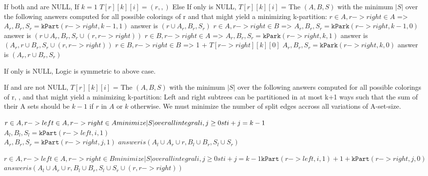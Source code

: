 \documentclass[11pt]{article}
\begin{document}
    If both \rleft and \rright are NULL,
        If $k=1$
            $T[r][k][i] = ({r}, {}, {})$
        Else
    If only \rleft is NULL,
        $T[r][k][i]$ = The $(A,B,S)$ with the minimum $|S|$ over the following answers computed for all possible colorings of r and \rright that might yield a minimizing k-partition:
          $r \in A, r->right \in A$ =>
            $A_r, B_r, S_r = \mathtt{kPart}(r->right,k-1,1)$
            answer is $({r} \cup A_r, B_r, S_r)$
          $r \in A, r->right \in B$ =>
            $A_r, B_r, S_r = \mathtt{kPark}(r->right,k-1,0)$
            answer is $({r} \cup A_r, B_r, S_r \cup {(r, r->right)})$
          $r \in B, r->right \in A$ =>
            $A_r, B_r, S_r = \mathtt{kPark}(r->right,k,1)$
            answer is $(A_r,{r} \cup B_r, S_r \cup {(r, r->right)})$
          $r \in B, r->right \in B$ => 1 + $T[r->right][k][0]$
            $A_r, B_r, S_r = \mathtt{kPark}(r->right,k,0)$
            answer is $(A_r,{r} \cup B_r, S_r)$

    If only \rright is NULL,
        Logic is symmetric to above case.

    If \rleft and \rright are not NULL,
        $T[r][k][i]$ = The $(A,B,S)$ with the minimum $|S|$ over the following answers computed for all possible colorings of r, \rright, and \rleft that might yield a minimizing k-partition:
                Left and right subtrees can be partitioned in at most k+1 ways such that the sum of their A sets should be $k-1$ if $r$ in $A$ or $k$ otherwise.
                We must minimize the number of split edges accross all variations of A-set-size.

          $r \in A, r->left \in A, r->right \in A\\
              minimize |S| over all integral i,j \geq 0 st i+j = k-1$\\
                $A_l, B_l, S_l = \mathtt{kPart}(r->left,i,1)$\\
                $A_r, B_r, S_r = \mathtt{kPart}(r->right,j,1)$
                $answer is (A_l \cup A_r \cup {r},B_l \cup B_r,S_l \cup S_r)$

          $r \in A, r->left \in A, r->right \in B
              minimize |S| over all integral i,j \geq 0 st i+j = k-1
                    \mathtt{kPart}(r->left,i,1) + 1 + \mathtt{kPart}(r->right,j,0)$
                $answer is (A_l \cup A_r \cup {r},B_l \cup B_r,S_l \cup S_r \cup {(r, r->right)})$
\end{document}
